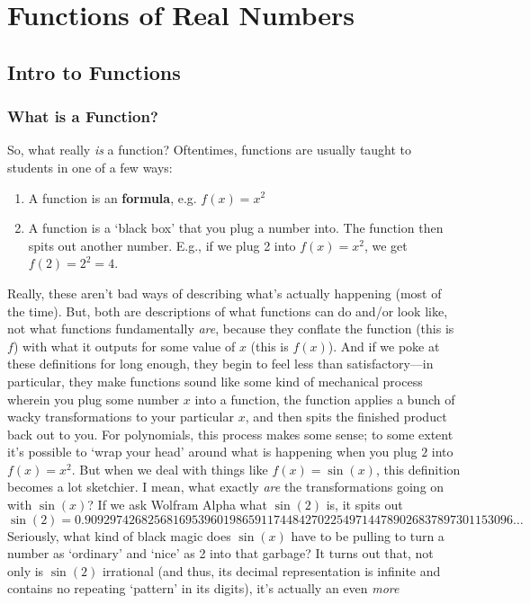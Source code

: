 \documentclass[10pt]{article}
\theoremstyle{definition}
\begin{document}
{\section{Functions of Real Numbers}
\subsection{Intro to Functions}
\subsubsection{What is a Function?}
So, what really \emph{is} a function?  Oftentimes, functions are
usually taught to students in one of a few ways:
\begin{enumerate}
    \item A function is an \textbf{formula}, e.g. $f(x) = x^2$
    \item A function is a `black box' that you plug a number into.
      The function then spits out another number.  E.g., if we plug 2
      into $f(x) = x^2$, we get $f(2) = 2^2 = 4$.
\end{enumerate}
Really, these aren't bad ways of describing what's actually happening
(most of the time).  But, both are descriptions of what functions can
do and/or look like, not what functions fundamentally \emph{are},
because they conflate the function (this is $f$) with what it outputs
for some value of $x$ (this is $f(x)$).  And if we poke at these
definitions for long enough, they begin to feel less than
satisfactory---in particular, they make functions sound like some kind
of mechanical process wherein you plug some number $x$ into a
function, the function applies a bunch of wacky transformations to
your particular $x$, and then spits the finished product back out to
you.  For polynomials, this process makes some sense; to some extent
it's possible to `wrap your head' around what is happening when you
plug $2$ into $f(x)=x^2$.  But when we deal with things like $f(x) =
\sin(x)$, this definition becomes a lot sketchier.  I mean, what
exactly \emph{are} the transformations going on with $\sin(x)$?  If we
ask Wolfram Alpha what $\sin(2)$ is, it spits out
\[\sin(2) = 0.90929742682568169539601986591174484270225497144789026837897301153096\ldots\]
Seriously, what kind of black magic does $\sin(x)$ have to be pulling
to turn a number as `ordinary' and `nice' as 2 into that
garbage?  It turns out that, not only is $\sin(2)$ irrational (and
thus, its decimal representation is infinite and contains no repeating
`pattern' in its digits), it's actually an even \emph{more}
}
\end{document}
